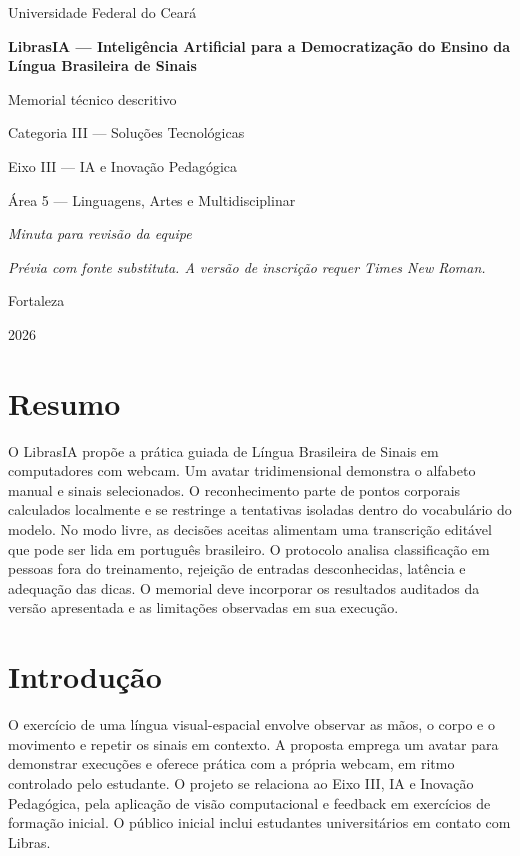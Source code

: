 \documentclass[12pt,a4paper]{article}
\newif\ifsubmissionfont
\newcommand{\projecttitle}{LibrasIA — Inteligência Artificial para a Democratização do Ensino da Língua Brasileira de Sinais}
\begin{document}
\begin{titlepage}
  \centering
  Universidade Federal do Ceará\par
  \vfill
  \textbf{\projecttitle}\par
  \medskip
  Memorial técnico descritivo\par
  Categoria III — Soluções Tecnológicas\par
  Eixo III — IA e Inovação Pedagógica\par
  Área 5 — Linguagens, Artes e Multidisciplinar\par
  \medskip
  \textit{Minuta para revisão da equipe}\par
  \ifsubmissionfont\else
    \textit{Prévia com fonte substituta. A versão de inscrição requer Times New Roman.}\par
  \fi
  \vfill
  Fortaleza\par
  2026
\end{titlepage}

\section*{Resumo}

O LibrasIA propõe a prática guiada de Língua Brasileira de Sinais em computadores com webcam. Um avatar tridimensional demonstra o alfabeto manual e sinais selecionados. O reconhecimento parte de pontos corporais calculados localmente e se restringe a tentativas isoladas dentro do vocabulário do modelo. No modo livre, as decisões aceitas alimentam uma transcrição editável que pode ser lida em português brasileiro. O protocolo analisa classificação em pessoas fora do treinamento, rejeição de entradas desconhecidas, latência e adequação das dicas. O memorial deve incorporar os resultados auditados da versão apresentada e as limitações observadas em sua execução.

\section{Introdução}

O exercício de uma língua visual-espacial envolve observar as mãos, o corpo e o movimento e repetir os sinais em contexto. A proposta emprega um avatar para demonstrar execuções e oferece prática com a própria webcam, em ritmo controlado pelo estudante. O projeto se relaciona ao Eixo III, IA e Inovação Pedagógica, pela aplicação de visão computacional e feedback em exercícios de formação inicial. O público inicial inclui estudantes universitários em contato com Libras.
\end{document}
